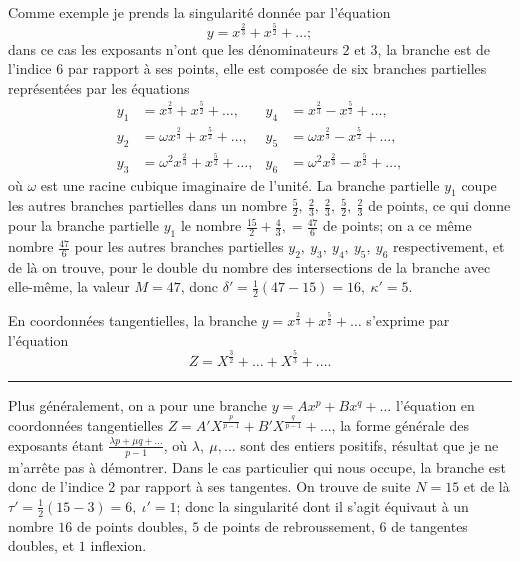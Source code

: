 \documentclass[11pt]{article}
\begin{document}
Comme exemple je prends la singularit\'e donn\'ee par l'\'equation
\[
y = x^{\tfrac{2}{3}} + x^{\tfrac{5}{2}} + \ldots ;
\]
dans ce cas les exposants n'ont que les d\'enominateurs $2$ et $3$, la branche est de l'indice $6$ par rapport \`a ses points, elle est compos\'ee de six branches partielles repr\'esent\'ees par les \'equations
\begin{align*}
y_{1} &= x^{\tfrac{2}{3}} + x^{\tfrac{5}{2}} + \ldots , & y_{4} &= x^{\tfrac{2}{3}} - x^{\tfrac{5}{2}} + \ldots , \\
y_{2} &= \omega x^{\tfrac{2}{3}} + x^{\tfrac{5}{2}} + \ldots , & y_{5} &= \omega x^{\tfrac{2}{3}} - x^{\tfrac{5}{2}} + \ldots , \\
y_{3} &= \omega^{2} x^{\tfrac{2}{3}} + x^{\tfrac{5}{2}} + \ldots , & y_{6} &= \omega^{2} x^{\tfrac{2}{3}} - x^{\tfrac{5}{2}} + \ldots ,
\end{align*}
o\`u $\omega$ est une racine cubique imaginaire de l'unit\'e. La branche partielle $y_{1}$ coupe les autres branches partielles dans un nombre $\tfrac{5}{2},\ \tfrac{2}{3},\ \tfrac{2}{3},\ \tfrac{5}{2},\ \tfrac{2}{3}$ de points, ce qui donne pour la branche partielle $y_{1}$ le nombre $\tfrac{15}{2} + \tfrac{4}{3},= \tfrac{47}{6}$ de points; on a ce m\^eme nombre $\tfrac{47}{6}$ pour les autres branches partielles $y_{2},\ y_{3},\ y_{4},\ y_{5},\ y_{6}$ respectivement, et de l\`a on trouve, pour le double du nombre des intersections de la branche avec elle-m\^eme, la valeur $M = 47$, donc $\delta' = \tfrac{1}{2}(47-15) = 16,\ \kappa' = 5$.

En coordonn\'ees tangentielles, la branche $y = x^{\tfrac{2}{3}} + x^{\tfrac{5}{2}} + \ldots$ s'exprime par l'\'equation
\[
Z = X^{\tfrac{3}{2}} + \ldots + X^{\tfrac{5}{3}} + \ldots .
\]

\bigskip
\hrule
\bigskip

Plus g\'en\'eralement, on a pour une branche $y = A x^{p} + B x^{q} + \ldots$ l'\'equation en coordonn\'ees tangentielles $Z = A' X^{\tfrac{p}{p-1}} + B' X^{\tfrac{q}{p-1}} + \ldots$, la forme g\'en\'erale des exposants \'etant $\tfrac{\lambda p + \mu q + \ldots}{p-1}$, o\`u $\lambda,\ \mu, \ldots$ sont des entiers positifs, r\'esultat que je ne m'arr\^ete pas \`a d\'emontrer. Dans le cas particulier qui nous occupe, la branche est donc de l'indice $2$ par rapport \`a ses tangentes. On trouve de suite $N = 15$ et de l\`a $\tau' = \tfrac{1}{2}(15-3) = 6,\ \iota' = 1$; donc la singularit\'e dont il s'agit \'equivaut \`a un nombre $16$ de points doubles, $5$ de points de rebroussement, $6$ de tangentes doubles, et $1$ inflexion.
\end{document}
